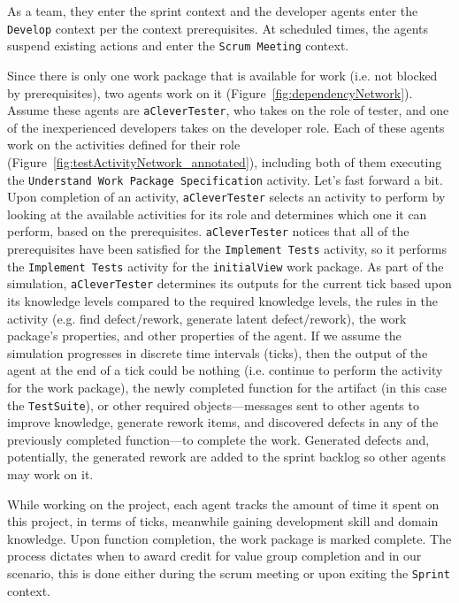 As a team, they enter the sprint context and the developer agents enter the
\texttt{Develop} context per the context prerequisites.  At scheduled times, the
agents suspend existing actions and enter the \texttt{Scrum Meeting} context.

Since there is only one work package that is available for work (i.e.
not blocked by prerequisites), two agents work on it
(Figure~\ref{fig:dependencyNetwork}).  Assume these agents are
\texttt{aCleverTester}, who takes on the role of tester, and one of the
inexperienced developers takes on the developer role.  Each of these agents work
on the activities defined for their role
(Figure~\ref{fig:testActivityNetwork_annotated}), including both of them
executing the \texttt{Understand Work Package Specification} activity.
Let's fast forward a bit.  Upon completion of an activity,
\texttt{aCleverTester} selects an activity to perform by looking at the
available activities for its role and determines which one it can perform, based
on the prerequisites.  \texttt{aCleverTester} notices that all of the
prerequisites have been satisfied for the \texttt{Implement Tests} activity, so
it performs the \texttt{Implement Tests} activity for the \texttt{initialView}
work package.  As part of the simulation, \texttt{aCleverTester} determines its
outputs for the current tick based upon its knowledge levels compared to the
required knowledge levels, the rules in the activity (e.g. find defect/rework,
generate latent defect/rework), the work package's properties, and other
properties of the agent.  If we assume the simulation progresses in discrete
time intervals (ticks), then the output of the agent at the end of a tick could
be nothing (i.e. continue to perform the activity for the work package),  the
newly completed function for the artifact (in this case the \texttt{TestSuite}),
or other required objects---messages sent to other agents to improve
knowledge, generate rework items, and discovered defects in any of the previously
completed function---to complete the work.  Generated defects and, potentially,
the generated rework are added to the sprint backlog so other agents may work on it.

While working on the project, each agent tracks the amount of time it spent on
this project, in terms of ticks, meanwhile gaining development skill and domain
knowledge.  Upon function completion, the work package is marked complete.  The
process dictates when to award credit for value group completion and in our
scenario, this is done either during the scrum meeting or upon
exiting the \texttt{Sprint} context.

